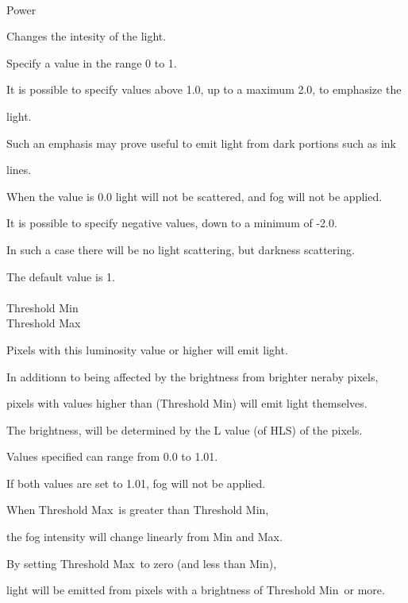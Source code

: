 \documentclass[a4paper,12pt]{article}
\begin{document}
\ \vspace{-0.2em}
\par
\noindent Power\par
Changes the intesity of the light.\par
Specify a value in the range 0 to 1.\par
It is possible to specify values above 1.0, up to a maximum 2.0, to emphasize the\par 
light.\par
Such an emphasis may prove useful to emit light from dark portions such as ink\par 
lines.\par
When the value is 0.0 light will not be scattered, and fog will not be applied.\par
It is possible to specify negative values, down to a minimum of -2.0.\par
In such a case there will be no light scattering, but darkness scattering.\par
The default value is 1.\\
\\
Threshold Min\\
Threshold Max\par
Pixels with this luminosity value or higher will emit light.\\
\par
In additionn to being affected by the brightness from brighter neraby pixels,\par
pixels with values higher than (\textquotedbl Threshold Min\textquotedbl ) will emit light themselves.\par
The brightness, will be determined by the L value (of HLS) of the pixels.\\
\par
Values specified can range from 0.0 to 1.01.\\
\par
If both values are set to 1.01, fog will not be applied.\\
\par
When \textquotedbl Threshold Max\textquotedbl \ is greater than \textquotedbl Threshold Min\textquotedbl ,\par
the fog intensity will change linearly from Min and Max.\\
\par
By setting \textquotedbl Threshold Max\textquotedbl \ to zero (and less than Min),\par
light will be emitted from pixels with a brightness of \textquotedbl Threshold Min\textquotedbl \ or more.\par
\end{document}
